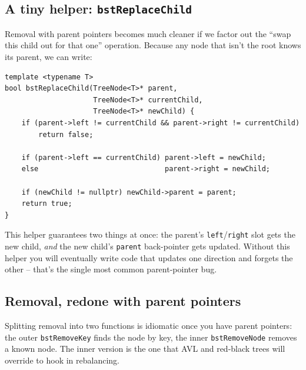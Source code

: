 \documentclass[11pt]{article}
\begin{document}
\subsection*{A tiny helper: \texttt{bstReplaceChild}}

Removal with parent pointers becomes much cleaner if we factor out the ``swap this child out for that one'' operation. Because any node that isn't the root knows its parent, we can write:

\begin{lstlisting}
template <typename T>
bool bstReplaceChild(TreeNode<T>* parent,
                     TreeNode<T>* currentChild,
                     TreeNode<T>* newChild) {
    if (parent->left != currentChild && parent->right != currentChild)
        return false;

    if (parent->left == currentChild) parent->left = newChild;
    else                              parent->right = newChild;

    if (newChild != nullptr) newChild->parent = parent;
    return true;
}
\end{lstlisting}

This helper guarantees two things at once: the parent's \texttt{left}/\texttt{right} slot gets the new child, \emph{and} the new child's \texttt{parent} back-pointer gets updated. Without this helper you will eventually write code that updates one direction and forgets the other -- that's the single most common parent-pointer bug.

\subsection*{Removal, redone with parent pointers}

Splitting removal into two functions is idiomatic once you have parent pointers: the outer \texttt{bstRemoveKey} finds the node by key, the inner \texttt{bstRemoveNode} removes a known node. The inner version is the one that AVL and red-black trees will override to hook in rebalancing.
\end{document}
